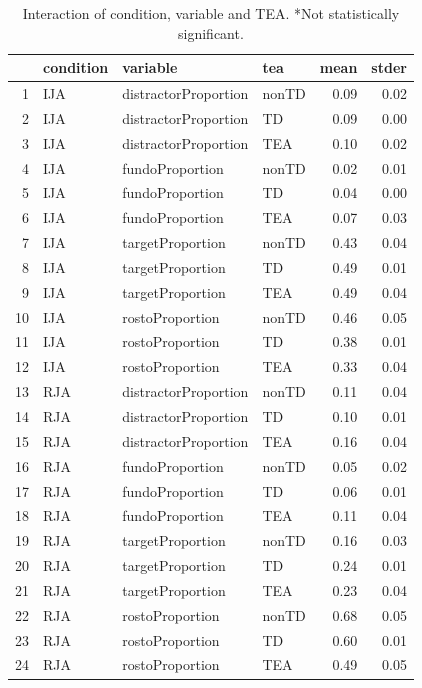 \documentclass{article}
\begin{document}
\begin{table}[ht]
\centering
\caption{Interaction of condition, variable and TEA. *Not statistically significant.}
\begin{tabular}{rlllrr}
  \hline
 & condition & variable & tea & mean & stder \\ 
  \hline
1 & IJA & distractorProportion & nonTD & 0.09 & 0.02 \\ 
  2 & IJA & distractorProportion & TD & 0.09 & 0.00 \\ 
  3 & IJA & distractorProportion & TEA & 0.10 & 0.02 \\ 
  4 & IJA & fundoProportion & nonTD & 0.02 & 0.01 \\ 
  5 & IJA & fundoProportion & TD & 0.04 & 0.00 \\ 
  6 & IJA & fundoProportion & TEA & 0.07 & 0.03 \\ 
  7 & IJA & targetProportion & nonTD & 0.43 & 0.04 \\ 
  8 & IJA & targetProportion & TD & 0.49 & 0.01 \\ 
  9 & IJA & targetProportion & TEA & 0.49 & 0.04 \\ 
  10 & IJA & rostoProportion & nonTD & 0.46 & 0.05 \\ 
  11 & IJA & rostoProportion & TD & 0.38 & 0.01 \\ 
  12 & IJA & rostoProportion & TEA & 0.33 & 0.04 \\ 
  13 & RJA & distractorProportion & nonTD & 0.11 & 0.04 \\ 
  14 & RJA & distractorProportion & TD & 0.10 & 0.01 \\ 
  15 & RJA & distractorProportion & TEA & 0.16 & 0.04 \\ 
  16 & RJA & fundoProportion & nonTD & 0.05 & 0.02 \\ 
  17 & RJA & fundoProportion & TD & 0.06 & 0.01 \\ 
  18 & RJA & fundoProportion & TEA & 0.11 & 0.04 \\ 
  19 & RJA & targetProportion & nonTD & 0.16 & 0.03 \\ 
  20 & RJA & targetProportion & TD & 0.24 & 0.01 \\ 
  21 & RJA & targetProportion & TEA & 0.23 & 0.04 \\ 
  22 & RJA & rostoProportion & nonTD & 0.68 & 0.05 \\ 
  23 & RJA & rostoProportion & TD & 0.60 & 0.01 \\ 
  24 & RJA & rostoProportion & TEA & 0.49 & 0.05 \\ 
   \hline
\end{tabular}
\end{table}
\end{document}
